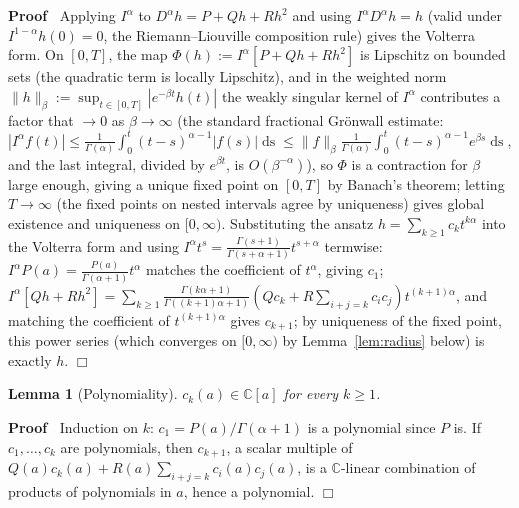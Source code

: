 \documentclass{article}
\newcommand{\assign}{:=}
\newcommand{\tmop}[1]{\ensuremath{\operatorname{#1}}}
\newenvironment{proof}{\noindent\textbf{Proof\ }}{\hspace*{\fill}$\Box$\medskip}
\newtheorem{lemma}{Lemma}
{\theorembodyfont{\rmfamily\small}\newtheorem{problem}{Problem}}
\newcommand{\C}{\mathbb{C}}
\begin{document}
\begin{proof}
  Applying $I^{\alpha}$ to $D^{\alpha} h = P + Qh + Rh^2$ and using $I^{\alpha}
  D^{\alpha} h = h$ (valid under $I^{1 - \alpha} h (0) = 0$, the
  Riemann--Liouville composition rule) gives the Volterra form. On $[0, T]$,
  the map $\Phi (h) \assign I^{\alpha} [P + Qh + Rh^2]$ is Lipschitz on
  bounded sets (the quadratic term is locally Lipschitz), and in the weighted
  norm $\| h \|_{\beta} \assign \sup_{t \in [0, T]} |e^{- \beta t} h (t) |$
  the weakly singular kernel of $I^{\alpha}$ contributes a factor that
  $\to 0$ as $\beta \to \infty$ (the standard fractional Gr{\"o}nwall
  estimate: $|I^{\alpha} f (t) | \le \frac{1}{\Gamma (\alpha)} \int_0^t (t -
  s)^{\alpha - 1} |f (s) |  \tmop{ds} \le \| f \|_{\beta}  \frac{1}{\Gamma
  (\alpha)} \int_0^t (t - s)^{\alpha - 1} e^{\beta s}  \tmop{ds}$, and the
  last integral, divided by $e^{\beta t}$, is $O (\beta^{- \alpha})$),
  so $\Phi$ is a contraction for $\beta$ large enough, giving a unique fixed
  point on $[0, T]$ by Banach's theorem; letting $T \to \infty$ (the fixed
  points on nested intervals agree by uniqueness) gives global existence and
  uniqueness on $[0, \infty)$. Substituting the ansatz $h = \sum_{k \ge 1} c_k
  t^{k \alpha}$ into the Volterra form and using $I^{\alpha} t^s = \frac{\Gamma
  (s + 1)}{\Gamma (s + \alpha + 1)} t^{s + \alpha}$ termwise: $I^{\alpha} P (a)
  = \frac{P (a)}{\Gamma (\alpha + 1)} t^{\alpha}$ matches the coefficient of
  $t^{\alpha}$, giving $c_1$; $I^{\alpha} [Qh + Rh^2] = \sum_{k \ge 1}
  \frac{\Gamma (k \alpha + 1)}{\Gamma ((k + 1) \alpha + 1)} \left( Q c_k + R
  \sum_{i + j = k} c_i c_j \right) t^{(k + 1) \alpha}$, and matching the
  coefficient of $t^{(k + 1) \alpha}$ gives $c_{k + 1}$; by uniqueness of the
  fixed point, this power series (which converges on $[0, \infty)$ by
  Lemma~\ref{lem:radius} below) is exactly $h$.
\end{proof}

\begin{lemma}
  [Polynomiality]\label{lem:polya} $c_k (a) \in \C [a]$ for every $k \ge 1$.
\end{lemma}

\begin{proof}
  Induction on $k$: $c_1 = P (a) / \Gamma (\alpha + 1)$ is a polynomial since
  $P$ is. If $c_1, \ldots, c_k$ are polynomials, then $c_{k + 1}$, a scalar
  multiple of $Q (a) c_k (a) + R (a) \sum_{i + j = k} c_i (a) c_j (a)$, is a
  $\C$-linear combination of products of polynomials in $a$, hence a
  polynomial.
\end{proof}
\end{document}

